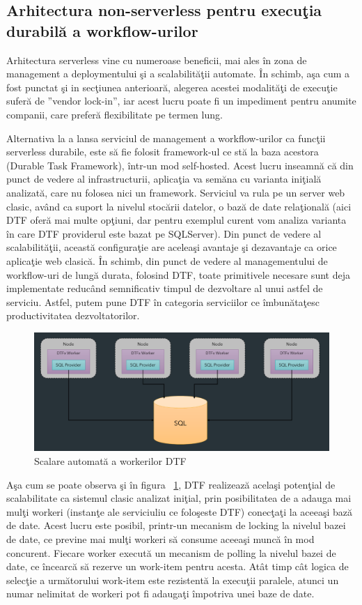 \subsection{Arhitectura non-serverless pentru execuţia durabilă a workflow-urilor}
\quad Arhitectura serverless vine cu numeroase beneficii, mai ales în zona de management a deploymentului şi a scalabilităţii automate. În schimb, aşa cum a fost punctat şi in secţiunea anterioară, alegerea acestei modalităţi de execuţie suferă de ''vendor lock-in'', iar acest lucru poate fi un impediment pentru anumite companii, care preferă flexibilitate pe termen lung. 
\par Alternativa la a lansa serviciul de management a workflow-urilor ca funcţii serverless durabile, este să fie folosit framework-ul ce stă la baza acestora (Durable Task Framework), într-un mod self-hosted. Acest lucru inseamnă că din punct de vedere al infrastructurii, aplicaţia va semăna cu varianta iniţială analizată, care nu folosea nici un framework. Serviciul va rula pe un server web clasic, având ca suport la nivelul stocării datelor, o bază de date relaţională (aici DTF oferă mai multe opţiuni, dar pentru exemplul curent vom analiza varianta în care DTF providerul este bazat pe SQLServer).
Din punct de vedere al scalabilităţii, această configuraţie are aceleaşi avantaje şi dezavantaje ca orice aplicaţie web clasică. În schimb, din punct de vedere al managementului de workflow-uri de lungă durata, folosind DTF, toate primitivele necesare sunt deja implementate reducând semnificativ timpul de dezvoltare al unui astfel de serviciu. Astfel, putem pune DTF în categoria serviciilor ce îmbunătaţesc productivitatea dezvoltatorilor.
 \begin{figure}[h]
\centering
        \includegraphics[width=1\textwidth]{images/dtf_scaling}
			 \caption{Scalare automată a workerilor DTF}
			 \label{fig:dtf-scaling}
\end{figure}
\par Aşa cum se poate observa şi în figura ~\ref{fig:dtf-scaling}, DTF realizează acelaşi potenţial de scalabilitate ca sistemul clasic analizat iniţial, prin posibilitatea de a adauga mai mulţi workeri (instanţe ale serviciuliu ce foloşeste DTF) conecţaţi la aceeaşi bază de date. Acest lucru este posibil, printr-un mecanism de locking la nivelul bazei de date, ce previne mai mulţi workeri să consume aceeaşi muncă în mod concurent. Fiecare worker execută un mecanism de polling la nivelul bazei de date, ce încearcă să rezerve un work-item pentru acesta. Atât timp cât logica de selecţie a următorului work-item este rezistentă la execuţii paralele, atunci un numar nelimitat de workeri pot fi adaugaţi împotriva unei baze de date. 
